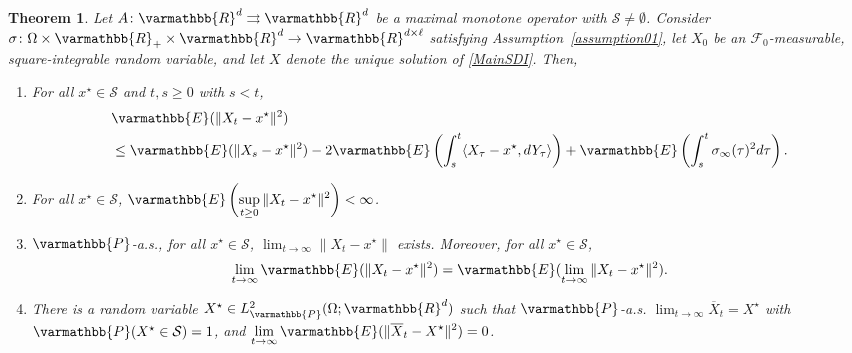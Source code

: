 \documentclass[11pt,reqno]{article}
\let\mathbb=\varmathbb
\newcommand{\R}{\mathbb{R}}
\newcommand{\1}{\mathds{1}}
\newcommand{\Aver}[2]{\overline{#1}_{#2}}
\numberwithin{equation}{section}  %
\theoremstyle{plain}
\newtheorem{theorem}{Theorem}
\theoremstyle{definition}
\theoremstyle{remark}
\numberwithin{theorem}{section}
\numberwithin{remark}{section}
\numberwithin{example}{section}
\begin{document}
 
    \begin{theorem}\label{main-thm-max-mon}
   Let $A \colon \mathbb{R}^d \rightrightarrows \mathbb{R}^d$  be  a maximal monotone operator with $\mathcal{S}\neq \emptyset$. Consider $\sigma \colon \Omega \times  \R_+ \times \mathbb{R}^d \to \mathbb{R}^{d\times \ell}$  satisfying  Assumption~\ref{assumption01}, let $X_0$ be an $\mathcal{F}_0$-measurable, square-integrable random variable, and let $X$ denote the unique solution of \eqref{MainSDI}. Then,

    	\begin{enumerate}[label = (\alph*)]
            \item For all $x^\star\in \mathcal{S}$ and $t,s\geq 0$ with $s<t$,
    		\begin{equation*}
                \begin{aligned}
                    &\mathbb{E}(\|X_t-x^\star\|^2)\\
                    &\leq \mathbb{E}(\|X_s-x^\star\|^2) -2\mathbb{E}\left(\int_s^t\langle X_\tau-x^\star,dY_\tau\rangle\right)+\mathbb{E} \left(\int_s^t\sigma_\infty(\tau)^2d\tau \right).
                \end{aligned}
    		\end{equation*}
    		\item For all $x^\star\in \mathcal{S}$, $\displaystyle\mathbb{E}\left(\sup_{t\geq 0}\|X_t-x^\star\|^2\right)<\infty$.
    		\item $\mathbb{P}$-a.s., for all $x^\star\in \mathcal{S}$, $\displaystyle\lim_{t\to \infty}\|X_t-x^\star\|$ exists. Moreover, for all  $x^\star\in \mathcal{S}$, 
            \begin{equation}\label{conv-L2-zeroe}
                \displaystyle\lim_{t\to\infty}\mathbb{E}(\|X_t-x^\star\|^2) = \mathbb{E}(\lim_{t\to \infty}\|X_t-x^\star\|^2).
            \end{equation}
    		\item There is a random variable $X^\star\in L^2_{\mathbb{P}}(\Omega;\R^d)$ such that $\mathbb{P}$-a.s. $\displaystyle\lim_{t\to \infty}\Aver{X}{t}  = X^\star$ with $\mathbb{P}(X^\star\in \mathcal{S})=1$, and $\displaystyle\lim_{t\to \infty}\mathbb{E}(\|\Aver{X}{t}-X^\star\|^2) = 0$.
    	\end{enumerate}
    \end{theorem}
\end{document}
